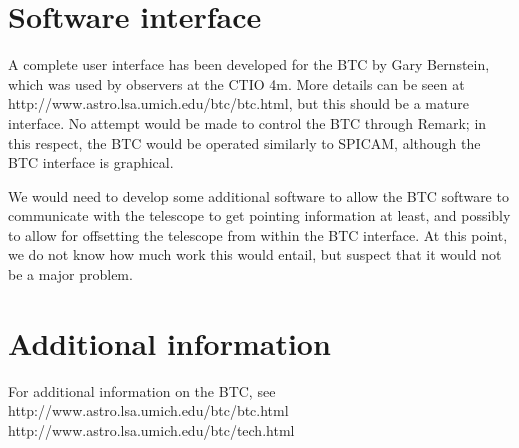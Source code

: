 \documentclass{article}
\begin{document}
\section{Software interface}

A complete user interface has been developed for the BTC by Gary
Bernstein, which was used by observers at the CTIO 4m. More details
can be seen at 
{http://www.astro.lsa.umich.edu/btc/btc.html}, but this  should be a
mature interface. No attempt would be made to control the BTC through
Remark; in this respect, the BTC would be operated similarly to SPICAM,
although the BTC interface is graphical.

We would need to develop some additional software to allow the BTC
software to communicate with the telescope to get pointing information
at least, and possibly to allow for offsetting the telescope from within
the BTC interface. At this point, we do not know how much work this
would entail, but suspect that it would not be a major problem.

\section{Additional information}

For additional information on the BTC, see
       {http://www.astro.lsa.umich.edu/btc/btc.html}
       {http://www.astro.lsa.umich.edu/btc/tech.html}
\end{document}
